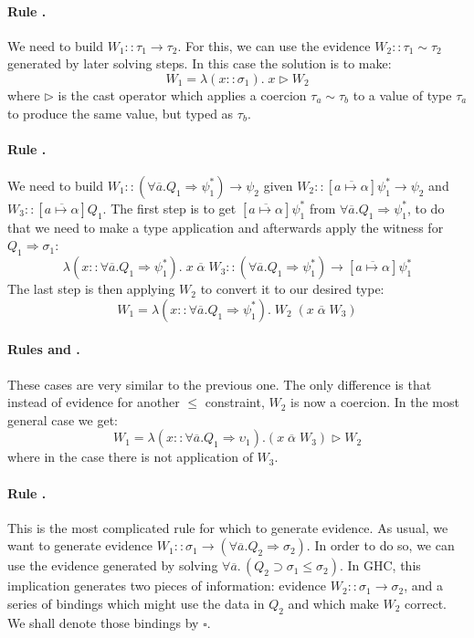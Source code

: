 \documentclass[12pt]{article}
\begin{document}
\paragraph{Rule {}.} We need to build $W_1 :: \tau_1 \to \tau_2$. For this, we can use the evidence $W_2 :: \tau_1 \sim \tau_2$ generated by later solving steps. In this case the solution is to make:
$$W_1 = \lambda (x :: \sigma_1). \; x \rhd W_2$$
where $\rhd$ is the cast operator which applies a coercion $\tau_a \sim \tau_b$ to a value of type $\tau_a$ to produce the same value, but typed as $\tau_b$.

\paragraph{Rule {}.} We need to build $W_1 :: (\forall \overline{a}. Q_1 \Rightarrow \psi^*_1) \to \psi_2$ given $W_2 :: [\overline{a \mapsto \alpha}]\psi^*_1 \to \psi_2$ and $W_3 :: [\overline{a \mapsto \alpha}]Q_1$. The first step is to get $[\overline{a \mapsto \alpha}]\psi^*_1$ from $\forall \overline{a}. Q_1 \Rightarrow \psi^*_1$, to do that we need to make a type application and afterwards apply the witness for $Q_1 \Rightarrow \sigma_1$:
$$\lambda (x :: \forall \overline{a}. Q_1 \Rightarrow \psi^*_1). \; x \; \overline{\alpha} \; W_3 :: (\forall \overline{a}. Q_1 \Rightarrow \psi^*_1) \to [\overline{a \mapsto \alpha}]\psi^*_1$$
The last step is then applying $W_2$ to convert it to our desired type:
$$W_1 = \lambda (x :: \forall \overline{a}. Q_1 \Rightarrow \psi^*_1). \; W_2 \; (x \; \overline{\alpha} \; W_3)$$

\paragraph{Rules {} and {}.} These cases are very similar to the previous one. The only difference is that instead of evidence for another $\leq$ constraint, $W_2$ is now a coercion. In the most general case we get:
$$W_1 = \lambda (x :: \forall \overline{a}. Q_1 \Rightarrow \upsilon_1). (x \; \overline{\alpha} \; W_3) \rhd W_2$$
where in the case {} there is not application of $W_3$.

\paragraph{Rule {}.} This is the most complicated rule for which to generate evidence. As usual, we want to generate evidence $W_1 :: \sigma_1 \to (\forall \overline{a}. Q_2 \Rightarrow \sigma_2)$. In order to do so, we can use the evidence generated by solving $\forall \overline{a}. \, (Q_2 \supset \sigma_1 \leq \sigma_2)$. In GHC, this implication generates two pieces of information: evidence $W_2 :: \sigma_1 \to \sigma_2$, and a series of bindings which might use the data in $Q_2$ and which make $W_2$ correct. We shall denote those bindings by $\square$.
\end{document}
